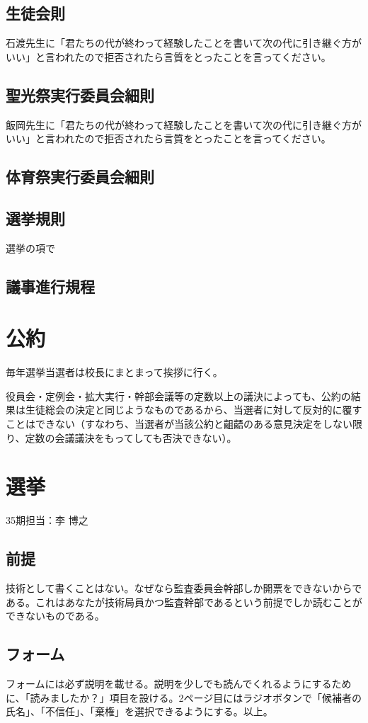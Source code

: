 \documentclass[a4paper]{ltjsreport}
\begin{document}
\subsection{生徒会則}
石渡先生に「君たちの代が終わって経験したことを書いて次の代に引き継ぐ方がいい」と言われたので拒否されたら言質をとったことを言ってください。
\subsection{聖光祭実行委員会細則}
飯岡先生に「君たちの代が終わって経験したことを書いて次の代に引き継ぐ方がいい」と言われたので拒否されたら言質をとったことを言ってください。
\subsection{体育祭実行委員会細則}
\subsection{選挙規則}
選挙の項で
\subsection{議事進行規程}
\section{公約}
毎年選挙当選者は校長にまとまって挨拶に行く。

役員会・定例会・拡大実行・幹部会議等の定数以上の議決によっても、公約の結果は生徒総会の決定と同じようなものであるから、当選者に対して反対的に覆すことはできない（すなわち、当選者が当該公約と齟齬のある意見決定をしない限り、定数の会議議決をもってしても否決できない）。
\section{選挙}
35期担当：李 博之
\subsection{前提}
技術として書くことはない。なぜなら監査委員会幹部しか開票をできないからである。これはあなたが技術局員かつ監査幹部であるという前提でしか読むことができないものである。
\subsection{フォーム}
フォームには必ず説明を載せる。説明を少しでも読んでくれるようにするために、「読みましたか？」項目を設ける。2ページ目にはラジオボタンで「候補者の氏名」、「不信任」、「棄権」を選択できるようにする。以上。
\end{document}
